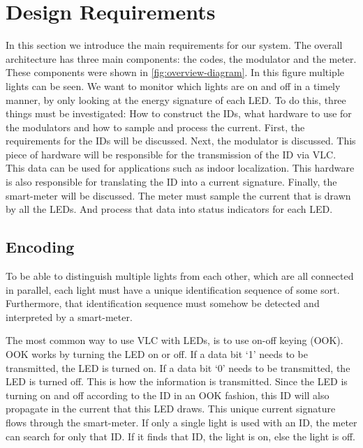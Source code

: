 
\chapter{Design Requirements}
\label{chp:design-requirements}


In this section we introduce the main requirements for our system. The overall architecture has three main components: the codes, the modulator and the meter. 
These components were shown in \autoref{fig:overview-diagram}.
In this figure multiple lights can be seen.
We want to monitor which lights are on and off in a timely manner, by only looking at the energy signature of each LED.
To do this, three things must be investigated: How to construct the IDs, what hardware to use for the modulators and how to sample and process the current.
First, the requirements for the IDs will be discussed.
Next, the modulator is discussed. 
This piece of hardware will be responsible for the transmission of the ID via VLC.
This data can be used for applications such as indoor localization.
This hardware is also responsible for translating the ID into a current signature.
Finally, the smart-meter will be discussed.
The meter must sample the current that is drawn by all the LEDs.
And process that data into status indicators for each LED.








	\section{Encoding}

	To be able to distinguish multiple lights from each other, which are all connected in parallel, each light must have a unique identification sequence of some sort.
	Furthermore, that identification sequence must somehow be detected and interpreted by a smart-meter.


	The most common way to use VLC with LEDs, is to use on-off keying (OOK).
	OOK works by turning the LED on or off.
	If a data bit `1' needs to be transmitted, the LED is turned on.
	If a data bit `0' needs to be transmitted, the LED is turned off.
	This is how the information is transmitted.
	Since the LED is turning on and off according to the ID in an OOK fashion, this ID will also propagate in the current that this LED draws.
	This unique current signature flows through the smart-meter.
	If only a single light is used with an ID, the meter can search for only that ID.
	If it finds that ID, the light is on, else the light is off.



